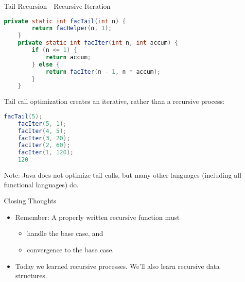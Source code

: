 \documentclass{beamer}
\begin{document}
\begin{frame}[fragile]{Tail Recursion - Recursive Iteration}

\vspace{-.05in}
\begin{lstlisting}[language=Java]
    private static int facTail(int n) {
        return facHelper(n, 1);
    }
    private static int facIter(int n, int accum) {
        if (n <= 1) {
            return accum;
        } else {
            return facIter(n - 1, n * accum);
        }
    }
\end{lstlisting}
\vspace{-.05in}
Tail call optimization creates an iterative, rather than a recursive process:
\vspace{-.05in}
\begin{lstlisting}[language=Java]
    facTail(5);
    facIter(5, 1);
    facIter(4, 5);
    facIter(3, 20);
    facIter(2, 60);
    facIter(1, 120);
    120
\end{lstlisting}
\vspace{-.05in}
Note: Java does not optimize tail calls, but many other languages (including all functional languages) do.

\end{frame}

\begin{frame}[fragile]{Closing Thoughts}


\begin{itemize}
\item Remember: A properly written recursive function must
\begin{itemize}
\item handle the base case, and
\item convergence to the base case.
\end{itemize}
\item Today we learned recursive processes.   We'll also learn recursive data structures.
\end{itemize}


\end{frame}







\end{document}
